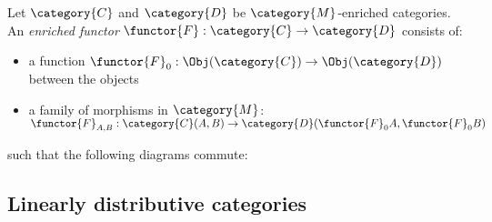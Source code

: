 \documentclass[DIN, pagenumber=false, fontsize=11pt, parskip=half, colorinlistoftodos, svgnames]{scrartcl}
\begin{document}
	\begin{definition}
		\label{def: enrichedFunctors}
		Let $\category{C} $ and $\category{D} $ be $\category{M} $-enriched categories. An \emph{enriched functor} $\functor{F} : \category{C} \rightarrow \category{D} $ consists of:
		\begin{itemize}
			\item 
			a function $\functor{F}_0 : \Obj(\category{C}) \rightarrow \Obj(\category{D}) $ between the objects
			\item 
			a family of morphisms in $\category{M} $: $\functor{F}_{A,B} : \category{C}(A, B) \rightarrow \category{D}(\functor{F}_0 A , \functor{F}_0 B) $
		\end{itemize}
		such that the following diagrams commute:
		\begin{center}
			
		\end{center}
	\end{definition}
\fi

	
	\subsection{Linearly distributive categories }
	\label{sec: linDisCats}
	
\end{document}
